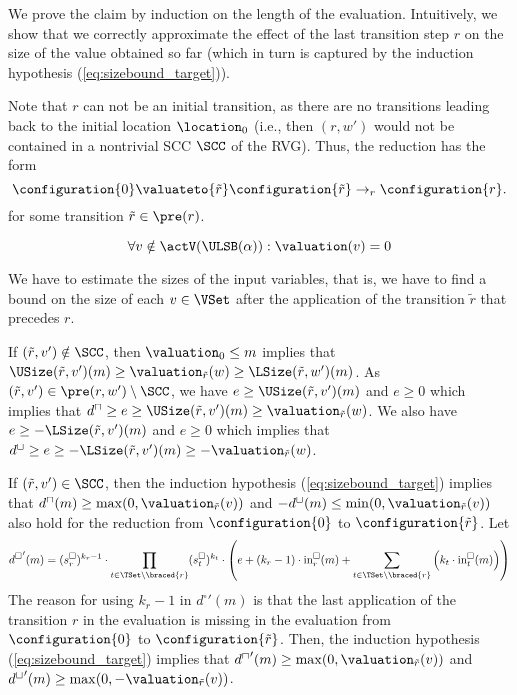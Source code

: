 We prove the claim by induction on the length of the evaluation.
Intuitively, we show that we correctly approximate the effect of the last transition step $r$ on the size of the value obtained so far (which in turn is captured by the induction hypothesis (\ref{eq:sizebound_target})).

Note that $r$ can not be an initial transition, as there are no transitions leading back to the initial location $\location_0$
(i.e., then $(r, w')$ would not be contained in a nontrivial SCC $\SCC$ of the RVG).
Thus, the reduction has the form
\[ \configuration{0} \valuateto{\tilde{r}} \configuration{\tilde{r}} \rightarrow_r \configuration{r}. \]
for some transition $\tilde{r} \in \pre(r)$.

\begin{equation} \label{eq:nonactiveequalzero}
  \forall v \notin \actV(\ULSB(\alpha)): \valuation(v) = 0
\end{equation}

We have to estimate the sizes of the input variables,
that is, we have to find a bound on the size of each $v \in \VSet$ after the application of the transition $\tilde{r}$ that precedes $r$.

If $(\tilde{r}, v') \notin \SCC$, then $\valuation_0 \leq m$ implies that $\USize(\tilde{r}, v')(m) \geq \valuation_{\tilde{r}}(w) \geq \LSize(\tilde{r}, w')(m)$.
As $(\tilde{r}, v') \in \pre(r, w') \setminus \SCC$, we have $e \geq \USize(\tilde{r}, v')(m)$ and $e \geq 0$ which implies that $d^\sqcap \geq e \geq \USize(\tilde{r}, v')(m) \geq \valuation_{\tilde{r}}(w)$.
We also have $e \geq -\LSize(\tilde{r}, v')(m)$ and $e \geq 0$ which implies that $d^\sqcup \geq e \geq -\LSize(\tilde{r}, v')(m) \geq -\valuation_{\tilde{r}}(w)$.

If $(\tilde{r}, v') \in \SCC$, then the induction hypothesis (\ref{eq:sizebound_target}) implies that $d^\sqcap(m) \geq \max(0, \valuation_{\tilde{r}}(v))$ and $-d^\sqcup(m) \leq \min(0, \valuation_{\tilde{r}}(v))$ also hold for the reduction from $\configuration{0}$ to $\configuration{\tilde{r}}$.
Let
\begin{equation} \label{eq:induction_consequence}
  {d^\square}'(m) = (s^\square_r)^{k_r - 1} \cdot \prod_{t \in \TSet \setminus \braced{r}} (s^\square_t)^{k_t} \cdot \left( e + \left( k_r - 1 \right) \cdot \text{in}^\square_r(m) + \sum_{t \in \TSet \setminus \braced{r}} \left( k_t \cdot \text{in}^\square_t(m) \right) \right)
\end{equation}
The reason for using $k_r - 1$ in ${d^\square}'(m)$ is that the last application of the transition $r$ in the evaluation is missing in the evaluation from $\configuration{0}$ to $\configuration{\tilde{r}}$.
Then, the induction hypothesis (\ref{eq:sizebound_target}) implies that ${d^\sqcap}'(m) \geq \max(0, \valuation_{\tilde{r}}(v))$ and ${d^\sqcup}'(m) \geq \max(0, -\valuation_{\tilde{r}}(v))$.

